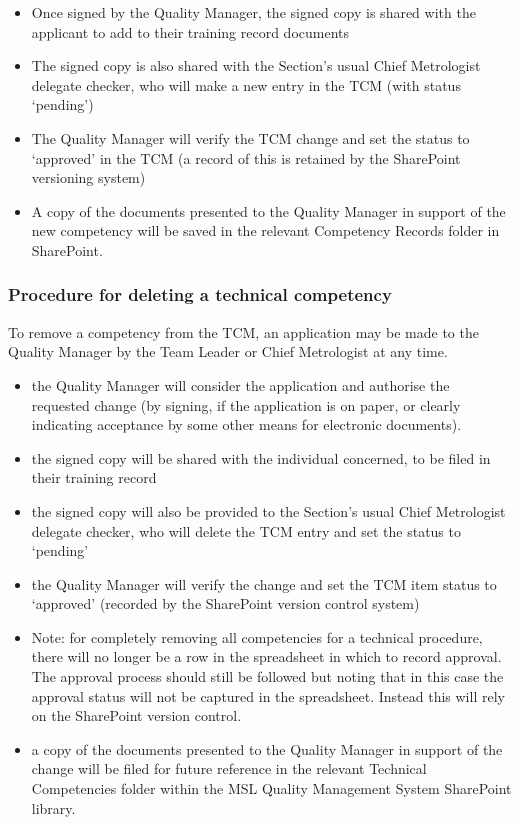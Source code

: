 \begin{itemize}
\item Once signed by the Quality Manager, the signed copy is shared with the applicant to add to their training record documents

\item The signed copy is also shared with the Section's usual Chief Metrologist delegate checker, who will make a new entry in the TCM (with status ‘pending')

\item The Quality Manager will verify the TCM change and set the status to ‘approved' in the TCM (a record of this is retained by the SharePoint versioning system)

\item A copy of the documents presented to the Quality Manager in support of the new competency will be saved in the relevant Competency Records folder in SharePoint.
\end{itemize}

\subsubsection{Procedure for deleting a technical competency}

To remove a competency from the TCM, an application may be made to the Quality Manager by the Team Leader or Chief Metrologist at any time.

\begin{itemize}
\item the Quality Manager will consider the application and authorise the requested change (by signing, if the application is on paper, or clearly indicating acceptance by some other means for electronic documents).

\item the signed copy will be shared with the individual concerned, to be filed in their training record

\item the signed copy will also be provided to the Section's usual Chief Metrologist delegate checker, who will delete the TCM entry and set the status to `pending' 

\item the Quality Manager will verify the change and set the TCM item status to ‘approved' (recorded by the SharePoint version control system)

\item Note: for completely removing all competencies for a technical procedure, there will no longer be a row in the spreadsheet in which to record approval.  The approval process should still be followed but noting that in this case the approval status will not be captured in the spreadsheet.  Instead this will rely on the SharePoint version control.

\item a copy of the documents presented to the Quality Manager in support of the change will be filed for future reference in the relevant Technical Competencies folder within the MSL Quality Management System SharePoint library.
\end{itemize}


